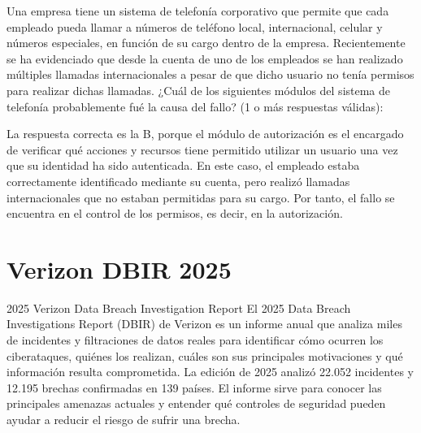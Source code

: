 \begin{mcq}{Una empresa tiene un sistema de telefonía corporativo que permite que cada empleado pueda llamar a números de teléfono local, internacional, celular y números especiales, en función de su cargo dentro de la empresa. Recientemente se ha evidenciado que desde la cuenta de uno de los empleados se han realizado múltiples llamadas internacionales a pesar de que dicho usuario no tenía permisos para realizar dichas llamadas. ¿Cuál de los siguientes módulos del sistema de telefonía probablemente fué la causa del fallo? (1 o más respuestas válidas):}
\end{mcq}
\begin{respuesta}
  La respuesta correcta es la B, porque el módulo de autorización es el encargado de verificar qué acciones y recursos tiene permitido utilizar un usuario una vez que su identidad ha sido autenticada. En este caso, el empleado estaba correctamente identificado mediante su cuenta, pero realizó llamadas internacionales que no estaban permitidas para su cargo. Por tanto, el fallo se encuentra en el control de los permisos, es decir, en la autorización.
\end{respuesta}

\section{Verizon DBIR 2025}

\begin{caso}{2025 Verizon Data Breach Investigation Report}
  El 2025 Data Breach Investigations Report (DBIR) de Verizon es un informe anual que analiza miles de incidentes y filtraciones de datos reales para identificar cómo ocurren los ciberataques, quiénes los realizan, cuáles son sus principales motivaciones y qué información resulta comprometida. La edición de 2025 analizó 22.052 incidentes y 12.195 brechas confirmadas en 139 países. El informe sirve para conocer las principales amenazas actuales y entender qué controles de seguridad pueden ayudar a reducir el riesgo de sufrir una brecha.
\end{caso}

\nocite{dbir2025}


